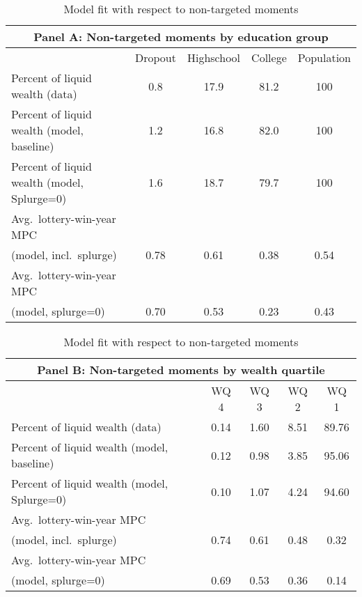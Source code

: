 \documentclass[qe]{econsocart}
\begin{document}
\begin{table}[tb] 
  \caption{Model fit with respect to non-targeted moments}
  \label{tab:nonTargetedMoments-wSplZero} 
  \centering

  \begin{tabular*}
    {\textwidth}{@{\extracolsep{\fill}}lcccc@{}}
    \multicolumn{5}{c}{\small Panel A: Non-targeted moments by education group} \\
    \hline
    & Dropout & Highschool & College & Population \\ \hline
    Percent of liquid wealth (data)             & 0.8  & 17.9 & 81.2 & 100 \\
    Percent of liquid wealth (model, baseline)  & 1.2  & 16.8 & 82.0 & 100 \\
    Percent of liquid wealth (model, Splurge=0) & 1.6  & 18.7 & 79.7 & 100 \\
    Avg.\ lottery-win-year MPC \\ \quad (model, incl.\ splurge) & 0.78 & 0.61 & 0.38 & 0.54 \\
    Avg.\ lottery-win-year MPC \\ \quad (model, splurge=0)     & 0.70 & 0.53 & 0.23 & 0.43 \\
    \hline
  \end{tabular*}

  \vspace{0.5em}

  \begin{tabular*}
    {\textwidth}{@{\extracolsep{\fill}}lcccc@{}}
    \multicolumn{5}{c}{\small Panel B: Non-targeted moments by wealth quartile} \\
    \hline
    & WQ 4 & WQ 3 & WQ 2 & WQ 1 \\ \hline
    Percent of liquid wealth (data)             & 0.14 & 1.60 & 8.51 & 89.76 \\
    Percent of liquid wealth (model, baseline)  & 0.12 & 0.98 & 3.85 & 95.06 \\
    Percent of liquid wealth (model, Splurge=0) & 0.10 & 1.07 & 4.24 & 94.60 \\
    Avg.\ lottery-win-year MPC \\ \quad (model, incl.\ splurge) & 0.74 & 0.61 & 0.48 & 0.32 \\
    Avg.\ lottery-win-year MPC \\ \quad (model, splurge=0)     & 0.69 & 0.53 & 0.36 & 0.14 \\
    \hline
  \end{tabular*}


\end{table}
\end{document}
